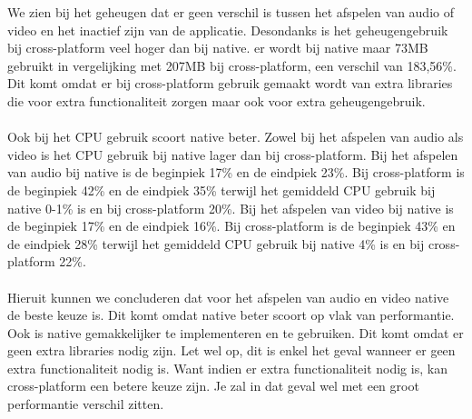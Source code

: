 We zien bij het geheugen dat er geen verschil is tussen het afspelen van audio of video 
en het inactief zijn van de applicatie. Desondanks is het geheugengebruik bij cross-platform veel 
hoger dan bij native. er wordt bij native maar 73MB gebruikt in vergelijking met 207MB 
bij cross-platform, een verschil van 183,56\%. 
Dit komt omdat er bij cross-platform gebruik gemaakt wordt van extra libraries die voor 
extra functionaliteit zorgen maar ook voor extra geheugengebruik.
\\\\
Ook bij het CPU gebruik scoort native beter. Zowel bij het afspelen van audio als video 
is het CPU gebruik bij native lager dan bij cross-platform. Bij het afspelen van audio bij 
native is de beginpiek 17\% en de eindpiek 23\%. Bij cross-platform is de 
beginpiek 42\% en de eindpiek 35\% terwijl het gemiddeld CPU gebruik bij native 0-1\% is en bij
cross-platform 20\%. Bij het afspelen van video bij native is de beginpiek 17\% en de eindpiek 16\%.
Bij cross-platform is de beginpiek 43\% en de eindpiek 28\% terwijl het gemiddeld CPU gebruik bij
native 4\% is en bij cross-platform 22\%. 
\\\\
Hieruit kunnen we concluderen dat voor het afspelen van audio en video native de beste keuze is.
Dit komt omdat native beter scoort op vlak van performantie. Ook is native gemakkelijker te implementeren
en te gebruiken. Dit komt omdat er geen extra libraries nodig zijn. Let wel op, dit is enkel het geval
wanneer er geen extra functionaliteit nodig is. Want indien er extra functionaliteit nodig is, kan
cross-platform een betere keuze zijn. Je zal in dat geval wel met een groot performantie verschil zitten.
















